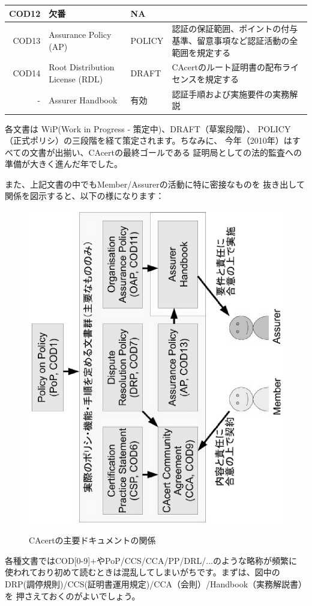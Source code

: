 \documentclass[mingoth,a4paper]{jsarticle}
\begin{document}
\begin{table}[H]
\begin{center}
\begin{tabular}{|r|p{10em}|l|p{20em}|}
COD12 &
欠番 & NA & \\ \hline

COD13 &
Assurance Policy (AP) & POLICY &
認証の保証範囲、ポイントの付与基準、留意事項など認証活動の全範囲を規定する \\ \hline

COD14 &
Root Distribution License (RDL) & DRAFT &
CAcertのルート証明書の配布ライセンスを規定する \\ \hline

- &
Assurer Handbook & 有効 &
認証手順および実施要件の実務解説 \\ \hline
\end{tabular}
\end{center}
\end{table}

各文書は WiP(Work in Progress - 策定中)、DRAFT（草案段階）、
POLICY（正式ポリシ）の三段階を経て策定されます。ちなみに、
今年（2010年）はすべての文書が出揃い、CAcertの最終ゴールである
証明局としての法的監査への準備が大きく進んだ年でした。

また、上記文書の中でもMember/Assurerの活動に特に密接なものを
抜き出して関係を図示すると、以下の様になります：

\begin{figure}[H]
\begin{center}
\includegraphics[width=0.6\hsize,angle=270]{image201012/cacertdocs.eps}
\label{cacertdocs}
\end{center}
\caption{CAcertの主要ドキュメントの関係}
\end{figure}

各種文書ではCOD[0-9]+やPoP/CCS/CCA/PP/DRL/...のような略称が頻繁に
使われており初めて読むときは混乱してしまいがちです。まずは、図中の
DRP(調停規則)/CCS(証明書運用規定)/CCA（会則）/Handbook（実務解説書）を
押さえておくのがよいでしょう。
\end{document}
